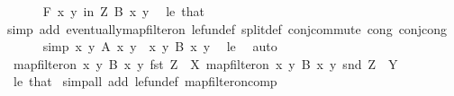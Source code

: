 \begin{isabellebody}
\ \ \ \ \isamarkupfalse%
\ {\isachardoublequoteopen}{\isasymforall}\isactrlsub F\ {\isacharparenleft}{\kern0pt}x{\isacharcomma}{\kern0pt}\ y{\isacharparenright}{\kern0pt}\ in\ {\isacharquery}{\kern0pt}Z{\isachardot}{\kern0pt}\ B\ x\ y{\isachardoublequoteclose}\ \isamarkupfalse%
\ le\ that\isanewline
\ \ \ \ \ \ \isamarkupfalse%
{\isacharparenleft}{\kern0pt}simp\ add{\isacharcolon}{\kern0pt}\ eventually{\isacharunderscore}{\kern0pt}map{\isacharunderscore}{\kern0pt}filter{\isacharunderscore}{\kern0pt}on\ le{\isacharunderscore}{\kern0pt}fun{\isacharunderscore}{\kern0pt}def\ split{\isacharunderscore}{\kern0pt}def\ conj{\isacharunderscore}{\kern0pt}commute\ cong{\isacharcolon}{\kern0pt}\ conj{\isacharunderscore}{\kern0pt}cong{\isacharparenright}{\kern0pt}\isanewline
\ \ \ \ \isamarkupfalse%
\ {\isacharbrackleft}{\kern0pt}simp{\isacharbrackright}{\kern0pt}{\isacharcolon}{\kern0pt}\ {\isachardoublequoteopen}{\isacharbraceleft}{\kern0pt}{\isacharparenleft}{\kern0pt}x{\isacharcomma}{\kern0pt}\ y{\isacharparenright}{\kern0pt}{\isachardot}{\kern0pt}\ A\ x\ y{\isacharbraceright}{\kern0pt}\ {\isasymsubseteq}\ {\isacharbraceleft}{\kern0pt}{\isacharparenleft}{\kern0pt}x{\isacharcomma}{\kern0pt}\ y{\isacharparenright}{\kern0pt}{\isachardot}{\kern0pt}\ B\ x\ y{\isacharbraceright}{\kern0pt}{\isachardoublequoteclose}\ \isamarkupfalse%
\ le\ \isamarkupfalse%
\ auto\isanewline
\ \ \ \ \isamarkupfalse%
\ {\isachardoublequoteopen}map{\isacharunderscore}{\kern0pt}filter{\isacharunderscore}{\kern0pt}on\ {\isacharbraceleft}{\kern0pt}{\isacharparenleft}{\kern0pt}x{\isacharcomma}{\kern0pt}\ y{\isacharparenright}{\kern0pt}{\isachardot}{\kern0pt}\ B\ x\ y{\isacharbraceright}{\kern0pt}\ fst\ {\isacharquery}{\kern0pt}Z\ {\isacharequal}{\kern0pt}\ {\isacharquery}{\kern0pt}X{\isachardoublequoteclose}\ {\isachardoublequoteopen}map{\isacharunderscore}{\kern0pt}filter{\isacharunderscore}{\kern0pt}on\ {\isacharbraceleft}{\kern0pt}{\isacharparenleft}{\kern0pt}x{\isacharcomma}{\kern0pt}\ y{\isacharparenright}{\kern0pt}{\isachardot}{\kern0pt}\ B\ x\ y{\isacharbraceright}{\kern0pt}\ snd\ {\isacharquery}{\kern0pt}Z\ {\isacharequal}{\kern0pt}\ {\isacharquery}{\kern0pt}Y{\isachardoublequoteclose}\isanewline
\ \ \ \ \ \ \isamarkupfalse%
\ le\ that\ \isamarkupfalse%
{\isacharparenleft}{\kern0pt}simp{\isacharunderscore}{\kern0pt}all\ add{\isacharcolon}{\kern0pt}\ le{\isacharunderscore}{\kern0pt}fun{\isacharunderscore}{\kern0pt}def\ map{\isacharunderscore}{\kern0pt}filter{\isacharunderscore}{\kern0pt}on{\isacharunderscore}{\kern0pt}comp{\isacharparenright}{\kern0pt}\isanewline

\end{isabellebody}
